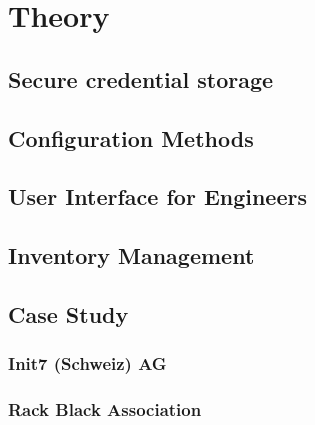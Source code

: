 \chapter{\label{theory}Theory}
\thispagestyle{fancy}




\section{Secure credential storage}



\section{Configuration Methods}


\section{User Interface for Engineers}

\section{Inventory Management}


\section{Case Study}

\subsection{Init7 (Schweiz) AG}

\subsection{Rack Black Association}
